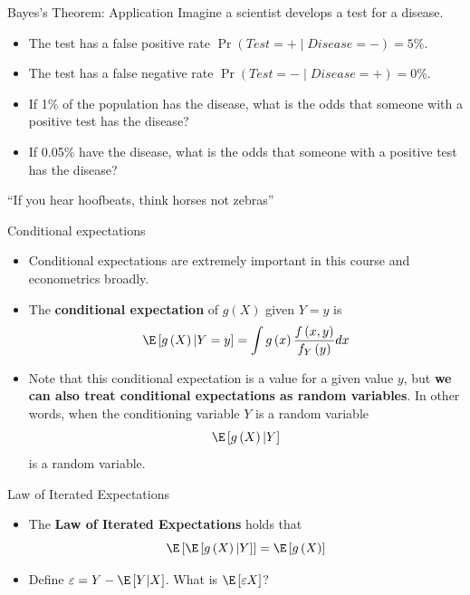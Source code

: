 \documentclass[aspectratio=169,11pt]{beamer}
\begin{document}
\begin{frame}{Bayes's Theorem: Application}
Imagine a scientist develops a test for a disease.
\begin{itemize}
	\item The test has a false positive rate $\Pr(Test = + \mid Disease = -) = 5\%$.
	\item The test has a false negative rate $\Pr(Test = - \mid Disease = +) = 0\%$.
\end{itemize}
\begin{itemize}
	\item If 1\% of the population has the disease, what is the odds that someone with a positive test has the disease?
	\item If 0.05\% have the disease, what is the odds that someone with a positive test has the disease?
\end{itemize}
``If you hear hoofbeats, think horses not zebras''
\end{frame}


\begin{frame}{Conditional expectations}
\begin{itemize}
	\item Conditional expectations are extremely important in this course and econometrics broadly. 
	
	\medskip
	\item The {\bf conditional expectation} of $g\left(X\right)$ given $Y=y$ is\[
		\E\left[g\left( X\right) | Y=y\right] = \int g\left(x\right) \frac{f\left(x,y\right)}{f_{Y}\left(y\right)}dx
	\]
	
	\medskip
	\item Note that this conditional expectation is a value for a given value $y$, but {\bf we can also treat conditional
			expectations as random variables}. In other words, when the conditioning variable $Y$ is a random variable\[
			\E\left[g\left( X\right) | Y \right] 
			\]
			is a random variable.
			
\end{itemize}
\end{frame}





\begin{frame}{Law of Iterated Expectations}
\begin{itemize}
	\item The {\bf Law of Iterated Expectations} holds that\[
			\E\left[\E\left[g\left(X\right)|Y\right]\right] = \E\left[g\left(X\right)\right]
	\]
	
	\medskip
	\item Define $\varepsilon = Y - \E\left[Y|X\right]$. What is $\E\left[\varepsilon X\right]$?
\end{itemize}
\end{frame}
\end{document}
